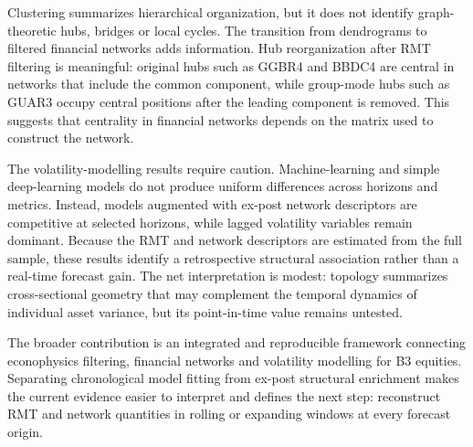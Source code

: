 Clustering summarizes hierarchical organization, but it does not identify graph-theoretic hubs, bridges or local cycles. The transition from dendrograms to filtered financial networks adds information. Hub reorganization after RMT filtering is meaningful: original hubs such as GGBR4 and BBDC4 are central in networks that include the common component, while group-mode hubs such as GUAR3 occupy central positions after the leading component is removed. This suggests that centrality in financial networks depends on the matrix used to construct the network.

The volatility-modelling results require caution. Machine-learning and simple deep-learning models do not produce uniform differences across horizons and metrics. Instead, models augmented with ex-post network descriptors are competitive at selected horizons, while lagged volatility variables remain dominant. Because the RMT and network descriptors are estimated from the full sample, these results identify a retrospective structural association rather than a real-time forecast gain. The net interpretation is modest: topology summarizes cross-sectional geometry that may complement the temporal dynamics of individual asset variance, but its point-in-time value remains untested.

The broader contribution is an integrated and reproducible framework connecting econophysics filtering, financial networks and volatility modelling for B3 equities. Separating chronological model fitting from ex-post structural enrichment makes the current evidence easier to interpret and defines the next step: reconstruct RMT and network quantities in rolling or expanding windows at every forecast origin.

